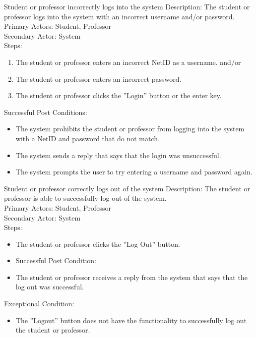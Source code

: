         \begin{section}{Student or professor incorrectly logs into the system}
    Description: The student or professor logs into the system with an incorrect username and/or password.\\
    Primary Actors: Student, Professor\\
    Secondary Actor: System\\
    Steps:
        \begin{enumerate}
            \item The student or professor enters an incorrect NetID as a username.
            	and/or
            \item The student or professor enters an incorrect password.
            \item The student or professor clicks the ''Login'' button or the enter key.\\
        \end{enumerate}
    Successful Post Conditions:
        \begin{itemize}
            \item The system prohibits the student or professor from logging into the system with a NetID and password that do not match.
            \item The system sends a reply that says that the login was unsuccessful.
            \item The system prompts the user to try entering a username and password again.
        \end{itemize}
    \end{section}



    \begin{section}{Student or professor correctly logs out of the system}
        Description: The student or professor is able to successfully log out of the system.\\
        Primary Actors: Student, Professor\\
        Secondary Actor: System\\
        Steps:
        \begin{itemize}
            \item The student or professor clicks the ''Log Out'' button.
            \item Successful Post Condition:
            \item The student or professor receives a reply from the system that says that the log out was successful.
        \end{itemize}
        Exceptional Condition:
        \begin{itemize}
            \item The ''Logout'' button does not have the functionality to successfully log out the student or professor.
        \end{itemize}
    \end{section}






